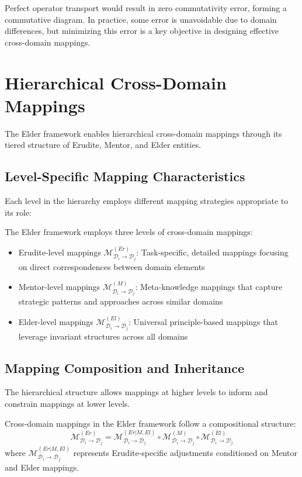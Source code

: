 Perfect operator transport would result in zero commutativity error, forming a commutative diagram. In practice, some error is unavoidable due to domain differences, but minimizing this error is a key objective in designing effective cross-domain mappings.

\section{Hierarchical Cross-Domain Mappings}

The Elder framework enables hierarchical cross-domain mappings through its tiered structure of Erudite, Mentor, and Elder entities.

\subsection{Level-Specific Mapping Characteristics}

Each level in the hierarchy employs different mapping strategies appropriate to its role:

\begin{definition}
The Elder framework employs three levels of cross-domain mappings:
\begin{itemize}
    \item Erudite-level mappings $\mathcal{M}^{(Er)}_{\mathcal{D}_i \rightarrow \mathcal{D}_j}$: Task-specific, detailed mappings focusing on direct correspondences between domain elements
    \item Mentor-level mappings $\mathcal{M}^{(M)}_{\mathcal{D}_i \rightarrow \mathcal{D}_j}$: Meta-knowledge mappings that capture strategic patterns and approaches across similar domains
    \item Elder-level mappings $\mathcal{M}^{(El)}_{\mathcal{D}_i \rightarrow \mathcal{D}_j}$: Universal principle-based mappings that leverage invariant structures across all domains
\end{itemize}
\end{definition}

\subsection{Mapping Composition and Inheritance}

The hierarchical structure allows mappings at higher levels to inform and constrain mappings at lower levels.

\begin{theorem}
Cross-domain mappings in the Elder framework follow a compositional structure:
\begin{equation}
\mathcal{M}^{(Er)}_{\mathcal{D}_i \rightarrow \mathcal{D}_j} = \mathcal{M}^{(Er|M,El)}_{\mathcal{D}_i \rightarrow \mathcal{D}_j} \circ \mathcal{M}^{(M)}_{\mathcal{D}_i \rightarrow \mathcal{D}_j} \circ \mathcal{M}^{(El)}_{\mathcal{D}_i \rightarrow \mathcal{D}_j}
\end{equation}
where $\mathcal{M}^{(Er|M,El)}_{\mathcal{D}_i \rightarrow \mathcal{D}_j}$ represents Erudite-specific adjustments conditioned on Mentor and Elder mappings.
\end{theorem}


